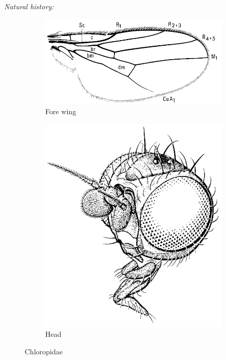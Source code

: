 \documentclass[letterpaper, 11pt]{article}
\begin{document}
\noindent{}\textit{Natural history:} \\

\begin{figure}[ht!]
    \centering
    \begin{subfigure}[ht!]{0.5\textwidth}
        \includegraphics[width=\textwidth]{ChloropidWing}
        \caption{Fore wing \citep[][Fig. 99.36]{mcalpine1981manualv2}}
        \label{fig:chloropid1}
    \end{subfigure}
    \qquad
    \begin{subfigure}[ht!]{0.25\textwidth}
        \includegraphics[width=\textwidth]{ChloropidHead}
        \caption{Head \citep[][Fig. 99.3]{mcalpine1981manualv2}}
        \label{fig:chloropid2}
    \end{subfigure}
    \caption{Chloropidae}\label{fig:chloropids}
\end{figure}
\end{document}
